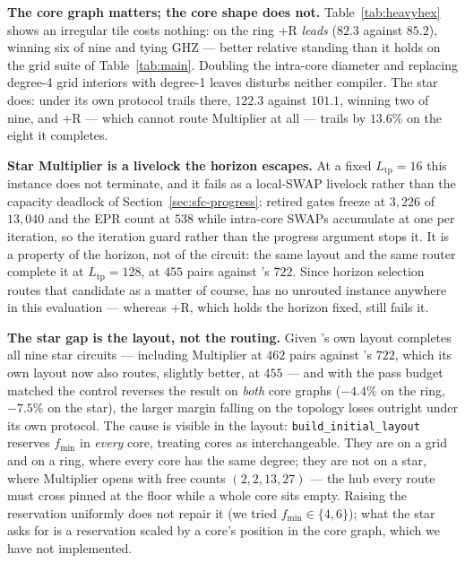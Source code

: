\textbf{The core graph matters; the core shape does not.}
Table~\ref{tab:heavyhex} shows an irregular
tile costs \PORTER{} nothing: on the ring \PORTER{}+R \emph{leads}
\dSABRE{} ($82.3$ against $85.2$), winning six of nine and tying GHZ ---
better relative standing than it holds on the grid suite of
Table~\ref{tab:main}. Doubling the intra-core diameter and replacing
degree-4 grid interiors with degree-1 leaves disturbs neither compiler.
The star does: under its own protocol \PORTER{} trails there, $122.3$
against $101.1$, winning two of nine, and \PORTER{}+R --- which cannot
route Multiplier at all --- trails by $13.6\%$ on the eight it
completes.

\textbf{Star Multiplier is a livelock the horizon escapes.} At a fixed
$L_\mathrm{tp}{=}16$ this instance does not terminate, and it fails as a
local-SWAP livelock rather than the capacity deadlock of
Section~\ref{sec:sfc-progress}: retired gates freeze at $3{,}226$ of
$13{,}040$ and the EPR count at $538$ while intra-core SWAPs accumulate
at one per iteration, so the iteration guard rather than the progress
argument stops it. It is a property of the horizon, not of the circuit:
the same layout and the same router complete it at
$L_\mathrm{tp}{=}128$, at $455$ pairs against \dSABRE{}'s $722$. Since
horizon selection routes that candidate as a matter of course,
\PORTER{} has no unrouted instance anywhere in this evaluation ---
whereas \PORTER{}+R, which holds the horizon fixed, still fails it.

\textbf{The star gap is the layout, not the routing.} Given
\dSABRE{}'s own layout \PORTER{} completes all nine star circuits ---
including Multiplier at $462$ pairs against \dSABRE{}'s $722$, which its
own layout now also routes, slightly better, at $455$ --- and
with the pass budget matched the control reverses the result on
\emph{both} core graphs ($-4.4\%$ on the ring, $-7.5\%$ on the star),
the larger margin falling on the topology \PORTER{} loses outright
under its own protocol. The cause is visible in the layout:
\texttt{build\_initial\_layout} reserves $f_\mathrm{min}$ in
\emph{every} core, treating cores as interchangeable. They are on a
grid and on a ring, where every core has the same degree; they are not
on a star, where Multiplier opens with free counts $(2,2,13,27)$ ---
the hub every route must cross pinned at the floor while a whole core
sits empty. Raising the reservation uniformly does not repair it (we
tried $f_\mathrm{min}{\in}\{4,6\}$); what the star asks for is a
reservation scaled by a core's position in the core graph, which we have
not implemented.

